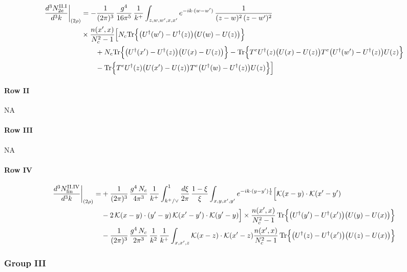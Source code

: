 \documentclass[9pt]{article}
\numberwithin{equation}{section}
\begin{document}
\begin{align}
\frac{d^{3}N^{\rm II.I}_{2e}}{d^{3}k}\bigg|_{(2\rho)}&= -\frac{1}{(2\pi)^{3}}\,\frac{g^{4}}{16\pi^{5}}\,\frac{1}{k^{+}}\int_{z,w,w^{\prime},x,x^{\prime}}e^{-ik\cdot(w-w^{\prime})}\,\frac{1}{(z-w)^{2}\,(z-w^{\prime})^{2}}\notag\\ &\times\frac{n(x',x)}{N_{c}^{2}-1}\Big[N_{c}{\rm Tr}\Big\{\big(U^{\dagger}(w')-U^{\dagger}(z)\big)\big(U(w)-U(z)\big)\Big\}\notag\\&\qquad+N_{c}{\rm Tr}\Big\{\big(U^{\dagger}(x')-U^{\dagger}(z)\big)\big(U(x)-U(z)\big)\Big\}-{\rm Tr}\Big\{T^{e}U^{\dagger}(z)\big(U(x)-U(z)\big)T^{e}\big(U^{\dagger}(w')-U^{\dagger}(z)\big)U(z)\Big\}\notag\\&\qquad-{\rm Tr}\Big\{T^{e}U^{\dagger}(z)\big(U(x')-U(z)\big)T^{e}\big(U^{\dagger}(w)-U^{\dagger}(z)\big)U(z)\Big\}\Big]\notag
\end{align}
\paragraph*{Row II}
\textsc{NA}
\paragraph*{Row III}
\textsc{NA}
\paragraph*{Row IV}

\begin{align}
\frac{d^{3}N^{\rm II.IV}_{\rm fin}}{d^{3}k}\bigg|_{(2\rho)}= &  +\frac{1}{(2\pi)^{3}}\,\frac{g^{4}\,N_{c}}{4\pi^{3}}\,\frac{1}{k^{+}}\int_{k^{+}/\vee}^{1}\frac{d\xi}{2\pi}\,\frac{1-\xi}{\xi}\int_{x,y,x',y'}e^{-ik\cdot(y-y')\frac{1}{\xi}}\Big[\mathcal{K}(x-y)\cdot\mathcal{K}(x'-y')\notag \\ & -2\,\mathcal{K}(x-y)\cdot(y'-y)\,\mathcal{K}(x'-y')\cdot\mathcal{K}(y'-y)\Big]\times\frac{n(x',x)}{N_{c}^{2}-1}\,{\rm Tr}\Big\{\big(U^{\dagger}(y')-U^{\dagger}(x')\big)\big(U(y)-U(x)\big)\Big\}\notag \\ & -\frac{1}{(2\pi)^{3}}\,\frac{g^{4}\,N_{c}}{2\pi^{3}}\,\frac{1}{k^{2}}\,\frac{1}{k^{+}}\int_{x,x',z}\mathcal{K}(x-z)\cdot\mathcal{K}(x'-z)\frac{n(x',x)}{N_{c}^{2}-1}\,{\rm Tr}\Big\{\big(U^{\dagger}(z)-U^{\dagger}(x')\big)\big(U(z)-U(x)\big)\Big\}\label{eq:S-II.IVrem}
\end{align}
\subsubsection{Group III}
\end{document}
